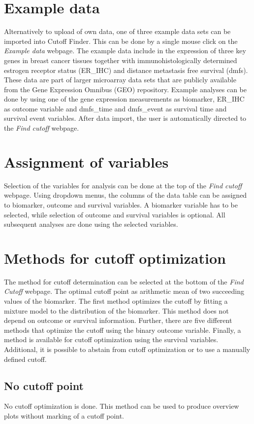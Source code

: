 \documentclass[12pt, a4paper]{article}
\begin{document}
\section{Example data}
Alternatively to upload of own data, one of three example data sets can be imported into Cutoff Finder.
This can be done by a single mouse click on the \emph{Example data} webpage.
The example data include in the expression of three key genes in breast cancer tissues together with immunohistologically determined estrogen receptor status (ER\_IHC) and distance metastasis free survival (dmfs).
These data are part of larger microarray data sets that are publicly available from the Gene Expression Omnibus (GEO) repository.
Example analyses can be done by using one of the gene expression measurements as biomarker, ER\_IHC as outcome variable and dmfs\_time and dmfs\_event as survival time and survival event variables.
After data import, the user is automatically directed to the \emph{Find cutoff} webpage.

\section{Assignment of variables}
Selection of the variables for analysis can be done at the top of the \emph{Find cutoff} webpage.
Using dropdown menus, the columns of the data table can be assigned to biomarker, outcome
and survival variables.
A biomarker variable has to be selected, while selection of outcome and survival variables is optional.
All subsequent analyses are done using the selected variables.

\section{Methods for cutoff optimization}

The method for cutoff determination can be selected at the bottom of the \emph{Find Cutoff} webpage.
The optimal cutoff point as arithmetic mean of two succeeding values of the biomarker.
The first method optimizes the cutoff by fitting a mixture model to the distribution of the biomarker.
This method does not depend on outcome or survival information.
Further, there are five different methods that optimize the cutoff using the binary outcome variable.
Finally, a method is available for cutoff optimization using the survival variables.
Additional, it is possible to abstain from cutoff optimization or to use a manually defined cutoff.

\subsection{No cutoff point}
No cutoff optimization is done.
This method can be used to produce overview plots without marking of a cutoff point.
\end{document}
